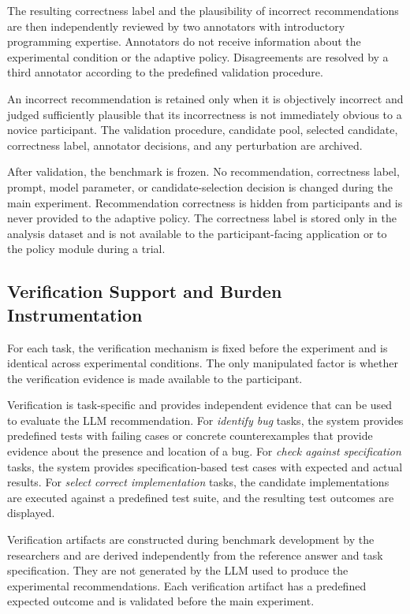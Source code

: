 \documentclass[oneside,final,14pt,a4paper]{extreport}
\begin{document}
The resulting correctness label and the plausibility of incorrect 
recommendations are then independently reviewed by two annotators with 
introductory programming expertise. Annotators do not receive information 
about the experimental condition or the adaptive policy. Disagreements are 
resolved by a third annotator according to the predefined validation procedure.

An incorrect recommendation is retained only when it is objectively incorrect 
and judged sufficiently plausible that its incorrectness is not immediately 
obvious to a novice participant. The validation procedure, candidate pool, 
selected candidate, correctness label, annotator decisions, and any 
perturbation are archived.

After validation, the benchmark is frozen. No recommendation, correctness 
label, prompt, model parameter, or candidate-selection decision is changed 
during the main experiment. Recommendation correctness is hidden from 
participants and is never provided to the adaptive policy. The correctness
label is stored only in the analysis dataset and is not available to the
participant-facing application or to the policy module during a trial.


\subsection{Verification Support and Burden Instrumentation}
\label{subsec:burden}

For each task, the verification mechanism is fixed before the experiment 
and is identical across experimental conditions. The only manipulated factor 
is whether the verification evidence is made available to the participant.

Verification is task-specific and provides independent evidence that 
can be used to evaluate the LLM recommendation. For \emph{identify bug} tasks, 
the system provides predefined tests with failing cases or concrete 
counterexamples that provide evidence about the presence and location of a bug. 
For \emph{check against specification} tasks, the system provides 
specification-based test cases with expected and actual results. For 
\emph{select correct implementation} tasks, the candidate implementations are 
executed against a predefined test suite, and the resulting test outcomes are 
displayed.

Verification artifacts are constructed during benchmark development 
by the researchers and are derived independently from the reference answer 
and task specification. They are not generated by the LLM used to produce 
the experimental recommendations. Each verification artifact has a predefined 
expected outcome and is validated before the main experiment.
\end{document}
